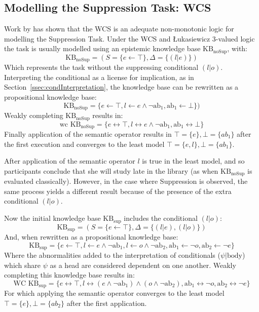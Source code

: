 \subsection{Modelling the Suppression Task: WCS} \label{ssec:sup_mod}
Work by \cite{dietz2014modeling} has shown that the WCS is an adequate non-monotonic logic for modelling the Suppression Task. Under the WCS and \L ukasiewicz 3-valued logic the task is usually modelled using an epistemic knowledge base $\text{KB}_\text{noSup}$, with:
\[\text{KB}_\text{noSup}=(S=\{e \leftarrow \top\}, \Delta=\{(l|e)\})\]
Which represents the  task without the suppressing conditional $(l|o)$. Interpreting the conditional as a license for implication, as in Section~\ref{ssec:condInterpretation}, the knowledge base can be rewritten as a propositional knowledge base:
\[\text{KB}_\text{noSup}=\{e \leftarrow \top, l \leftarrow e \land \lnot \text{ab}_1, \text{ab}_1\leftarrow \bot\})\]
Weakly completing $\text{KB}_\text{noSup}$ results in:
\[\text{wc KB}_\text{noSup}=\{e \leftrightarrow \top, l \leftrightarrow e \land \lnot \text{ab}_1, \text{ab}_1\leftrightarrow \bot\}\]
Finally application of the semantic operator results in $\top=\{e\}, \bot=\{ab_1\}$ after the first execution and converges to the least model $\top=\{e,l\}, \bot=\{ab_1\}$.

After application of the semantic operator $l$ is true in the least model, and so participants conclude that she will study late in the library (as when $\text{KB}_\text{noSup}$ is evaluated classically). However, in the case where Suppression is observed, the same process yields a different result because of the presence of the extra conditional $(l|o)$.

Now the initial knowledge base $\text{KB}_\text{sup}$ includes the conditional $(l|o)$:
\[\text{KB}_\text{sup}=(S=\{e \leftarrow \top\}, \Delta=\{(l|e),(l|o)\})\]
And, when rewritten as a propositional knowledge base:
\[\text{KB}_\text{sup}=\{e \leftarrow \top, l \leftarrow e \land \lnot \text{ab}_1, l \leftarrow o \land \lnot \text{ab}_2, \text{ab}_1\leftarrow \lnot o, \text{ab}_2\leftarrow \lnot e\}\]
Where the abnormalities added to the interpretation of conditionals ($\psi|\text{body}$) which share $\psi$ as a head are considered dependent on one another. Weakly completing this knowledge base results in:
\[\text{WC KB}_\text{sup}=\{e \leftrightarrow \top, l \leftrightarrow (e \land \lnot \text{ab}_1) \land (o \land \lnot \text{ab}_2), \text{ab}_1\leftrightarrow \lnot o, \text{ab}_2\leftrightarrow \lnot e\}\]
For which applying the semantic operator converges to the least model $\top=\{e\},\bot=\{ab_2\}$ after the first application.

